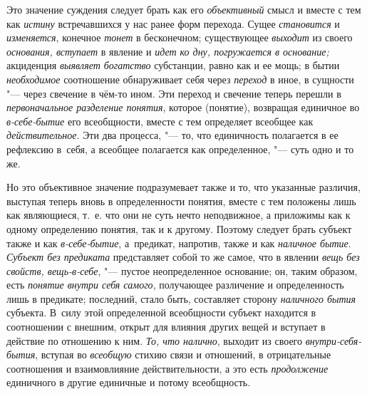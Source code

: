 \label{bkm:bm31a}Это значение суждения следует брать как его {\em объективный}
смысл и вместе с тем как {\em истину} встречавшихся у нас ранее форм перехода.
Сущее {\em становится} и {\em изменяется}, конечное {\em тонет} в бесконечном;
существующее {\em выходит} из своего {\em основания, вступает} в явление
и {\em идет ко дну, погружается в основание;} акциденция {\em выявляет
богатство} субстанции, равно как и ее мощь; в бытии {\em необходимое}
соотношение обнаруживает себя через {\em переход} в иное, в сущности "--- через
свечение в чём-то ином. Эти переход и свечение теперь перешли
в {\em первоначальное разделение понятия}, которое (понятие), возвращая
единичное во {\em в-себе-бытие} его всеобщности, вместе с тем определяет
всеобщее как {\em действительное}. Эти два процесса, "--- то, что единичность
полагается в ее рефлексию в~себя, а всеобщее полагается как
определенное, "--- суть одно и то же.

Но это объективное значение подразумевает также и то, что
указанные различия, выступая теперь вновь в определенности понятия, вместе
с тем положены лишь как являющиеся, т.~е. что они не суть нечто
неподвижное, а приложимы как к одному определению понятия, так и к другому.
Поэтому следует брать субъект также и как {\em в-себе-бытие},
а~предикат, напротив, также и как {\em наличное бытие}.
{\em Субъект без предиката} представляет собой то же самое, что в явлении
{\em вещь без свойств, вещь-в-себе}, "--- пустое неопределенное
основание; он, таким образом, есть {\em понятие внутри себя самого},
получающее различение и определенность лишь в предикате;
последний, стало быть, составляет сторону {\em наличного бытия}
субъекта. В~силу этой определенной всеобщности субъект
находится в соотношении с внешним, открыт для влияния других вещей и
вступает в действие по отношению к ним. {\em То, что налично}, выходит
из своего {\em внутри-себя-бытия}, вступая во {\em всеобщую}
стихию связи и отношений, в отрицательные соотношения и
взаимовлияние действительности, а это есть {\em продолжение}
единичного в другие единичные и потому всеобщность.

